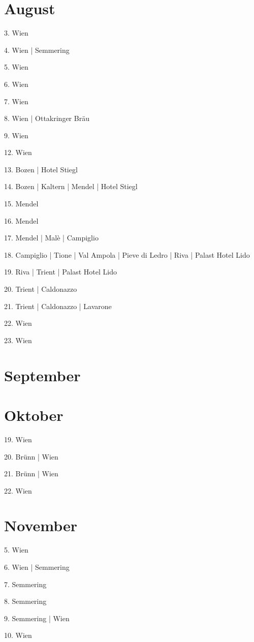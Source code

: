 \documentclass[twoside=false,titlepage=false,open=any, parskip=never, fontsize=10pt, headings=small, chapterprefix=false, appendixprefix=false, DIV=15]{scrbook}
\begin{document}
\begin{multicols}{3}
            \section*{August}
            3. Wien\par
            4. Wien | Semmering\par
            5. Wien\par
            6. Wien\par
            7. Wien\par
            8. Wien | Ottakringer Bräu\par
            9. Wien\par
            12. Wien\par
            13. Bozen | Hotel Stiegl\par
            14. Bozen | Kaltern | Mendel | Hotel Stiegl\par
            15. Mendel\par
            16. Mendel\par
            17. Mendel | Malè | Campiglio\par
            18. Campiglio | Tione | Val Ampola | Pieve di Ledro | Riva | Palast Hotel Lido\par
            19. Riva | Trient | Palast Hotel Lido\par
            20. Trient | Caldonazzo\par
            21. Trient | Caldonazzo | Lavarone\par
            22. Wien\par
            23. Wien\par
            \section*{September}
            \section*{Oktober}
            19. Wien\par
            20. Brünn | Wien\par
            21. Brünn | Wien\par
            22. Wien\par
            \section*{November}
            5. Wien\par
            6. Wien | Semmering\par
            7. Semmering\par
            8. Semmering\par
            9. Semmering | Wien\par
            10. Wien\par

\end{multicols}
\end{document}
